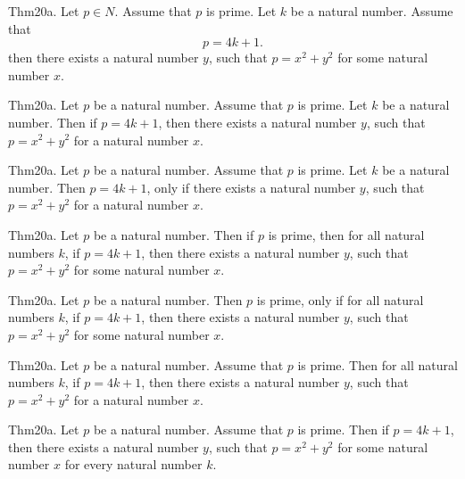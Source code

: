 \documentclass{article}
\begin{document}
Thm20a. Let $p \in N$. Assume that $p$ is prime. Let $k$ be a natural number. Assume that $$p = 4 k + 1.$$ then there exists a natural number $y$, such that $p = x ^{ 2}+ y ^{ 2}$ for some natural number $x$.

Thm20a. Let $p$ be a natural number. Assume that $p$ is prime. Let $k$ be a natural number. Then if $p = 4 k + 1$, then there exists a natural number $y$, such that $p = x ^{ 2}+ y ^{ 2}$ for a natural number $x$.

Thm20a. Let $p$ be a natural number. Assume that $p$ is prime. Let $k$ be a natural number. Then $p = 4 k + 1$, only if there exists a natural number $y$, such that $p = x ^{ 2}+ y ^{ 2}$ for a natural number $x$.

Thm20a. Let $p$ be a natural number. Then if $p$ is prime, then for all natural numbers $k$, if $p = 4 k + 1$, then there exists a natural number $y$, such that $p = x ^{ 2}+ y ^{ 2}$ for some natural number $x$.

Thm20a. Let $p$ be a natural number. Then $p$ is prime, only if for all natural numbers $k$, if $p = 4 k + 1$, then there exists a natural number $y$, such that $p = x ^{ 2}+ y ^{ 2}$ for some natural number $x$.

Thm20a. Let $p$ be a natural number. Assume that $p$ is prime. Then for all natural numbers $k$, if $p = 4 k + 1$, then there exists a natural number $y$, such that $p = x ^{ 2}+ y ^{ 2}$ for a natural number $x$.

Thm20a. Let $p$ be a natural number. Assume that $p$ is prime. Then if $p = 4 k + 1$, then there exists a natural number $y$, such that $p = x ^{ 2}+ y ^{ 2}$ for some natural number $x$ for every natural number $k$.
\end{document}
